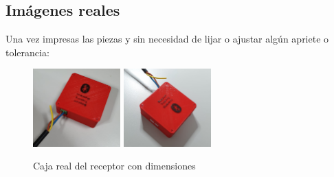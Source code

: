 \documentclass[paper=a4, fontsize=11pt,twoside]{scrartcl}
\begin{document}
    \subsection{Imágenes reales}
        Una vez impresas las piezas y sin necesidad de lijar o ajustar algún apriete o tolerancia:
        \begin{center}
            \begin{figure}[h]
                \centering
                \includegraphics[width=0.3\textwidth]{../3d_master_1.jpeg}
                \includegraphics[width=0.3\textwidth]{../3d_master_2.jpeg}
                \caption{Caja real del receptor con dimensiones}
                \label{fig:mesh1}
            \end{figure}
        \end{center}
\end{document}
